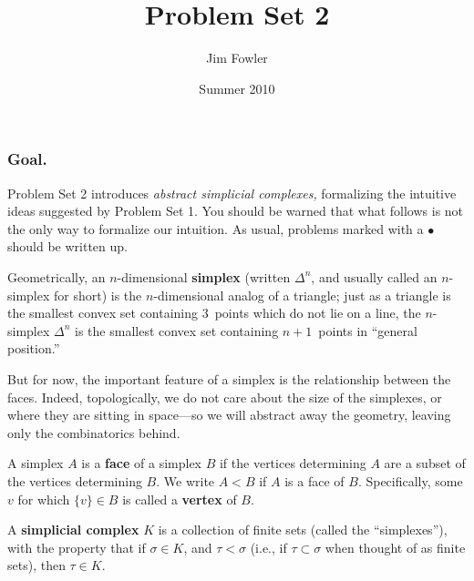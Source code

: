 \documentclass[12pt]{pset}
\title{Problem Set 2}
\author{Jim Fowler}
\date{Summer 2010}
\newcommand{\defnword}[1]{\textbf{#1}}
\begin{document}
\maketitle

\subsubsection*{Goal.} Problem Set 2 introduces \textit{abstract
  simplicial complexes,} formalizing the intuitive ideas suggested by
Problem Set 1.  You should be warned that what follows is not the only
way to formalize our intuition.  As usual, problems marked
  with a $\bullet$ should be written up.

\baselineskip
\parindent 0pt

\begin{definition*}
  Geometrically, an $n$-dimensional \defnword{simplex} (written
  $\Delta^n$, and usually called an $n$-simplex for short) is the
  $n$-dimensional analog of a triangle; just as a triangle is the
  smallest convex set containing 3~points which do not lie on a line,
  the $n$-simplex $\Delta^n$ is the smallest convex set containing
  $n+1$~points in ``general position.''

  But for now, the important feature of a simplex is the relationship
  between the faces.  Indeed, topologically, we do not care about the
  size of the simplexes, or where they are sitting in space---so we
  will abstract away the geometry, leaving only the combinatorics
  behind.

  A simplex $A$ is a \defnword{face} of a simplex $B$ if the vertices
  determining $A$ are a subset of the vertices determining $B$.  We
  write $A < B$ if $A$ is a face of $B$.  Specifically, some $v$ for which $\{v\}
  \in B$ is called a \defnword{vertex} of $B$.



  A \defnword{simplicial complex} $K$ is a collection of finite sets
 (called the ``simplexes''), with the property that if $\sigma \in
 K$, and $\tau < \sigma$ (i.e., if $\tau \subset \sigma$ when thought
 of as finite sets), then $\tau \in K$.


\end{definition*}
\end{document}
